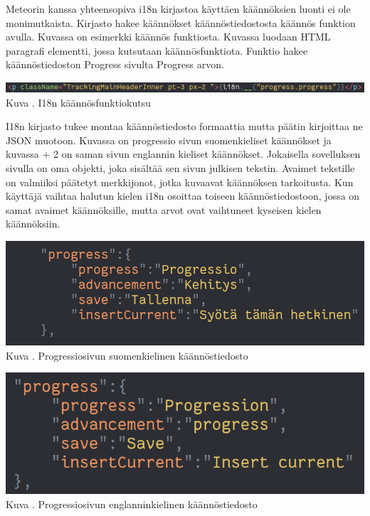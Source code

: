 \documentclass[11pt,a4paper,titlepage,oneside]{article}
\begin{document}

Meteorin kanssa yhteensopiva i18n kirjastoa käyttäen käännöksien luonti ei ole monimutkaista.
Kirjasto hakee käännökset käännöstiedostosta käännös funktion avulla.
Kuvassa \nextImageCount{} on esimerkki käännös funktiosta.
Kuvassa luodaan HTML paragrafi elementti, jossa kutsutaan käännösfunktiota. 
Funktio hakee käännöstiedoston Progress sivulta Progress arvon.\\
\medskip

\bigskip
\includegraphics[width = 15cm]{src/public/oppar/translationcall.png}\\
Kuva \getImgCount. {} I18n käännösfunktiokutsu 
\medskip



I18n kirjasto tukee montaa käännöstiedosto formaattia mutta päätin kirjoittaa ne JSON muotoon. %
Kuvassa \nextImageCount{} on progressio sivun suomenkieliset käännökset ja kuvassa {\the\numexpr \theimgCounter + 2 } on saman sivun englannin kieliset käännökset.
Jokaisella sovelluksen sivulla on oma objekti, joka sisältää sen sivun julkisen tekstin. 
Avaimet tekstille on valmiiksi päätetyt merkkijonot, jotka kuvaavat käännöksen tarkoitusta.
Kun käyttäjä vaihtaa halutun kielen i18n osoittaa toiseen käännöstiedostoon, 
jossa on samat avaimet käännöksille, mutta arvot ovat vaihtuneet kyseisen kielen käännöksiin.
\medskip


\bigskip
\includegraphics[width = 15cm]{src/public/oppar/translationfile.png}\\
Kuva \getImgCount. {} Progressiosivun suomenkielinen käännöstiedosto 
\medskip


\bigskip
\includegraphics[width = 15cm]{src/public/oppar/translationfileEng.png}\\
Kuva \getImgCount {}. Progressiosivun englanninkielinen käännöstiedosto
\medskip
\end{document}
